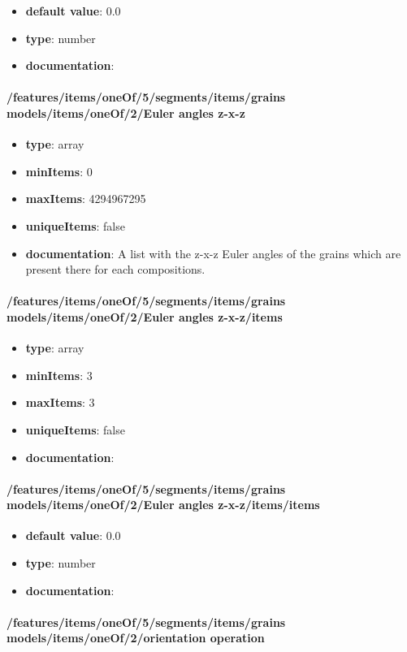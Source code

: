 \begin{itemize}\item {\bf default value}: 0.0
\item {\bf type}: number
\item {\bf documentation}: 
\end{itemize}\paragraph{/features/items/oneOf/5/segments/items/grains models/items/oneOf/2/Euler angles z-x-z}
\begin{itemize}\item {\bf type}: array
\item {\bf minItems}: 0
\item {\bf maxItems}: 4294967295
\item {\bf uniqueItems}: false
\item {\bf documentation}: A list with the z-x-z Euler angles of the grains which are present there for each compositions.
\end{itemize}\paragraph{/features/items/oneOf/5/segments/items/grains models/items/oneOf/2/Euler angles z-x-z/items}
\begin{itemize}\item {\bf type}: array
\item {\bf minItems}: 3
\item {\bf maxItems}: 3
\item {\bf uniqueItems}: false
\item {\bf documentation}: 
\end{itemize}\paragraph{/features/items/oneOf/5/segments/items/grains models/items/oneOf/2/Euler angles z-x-z/items/items}
\begin{itemize}\item {\bf default value}: 0.0
\item {\bf type}: number
\item {\bf documentation}: 
\end{itemize}\paragraph{/features/items/oneOf/5/segments/items/grains models/items/oneOf/2/orientation operation}
